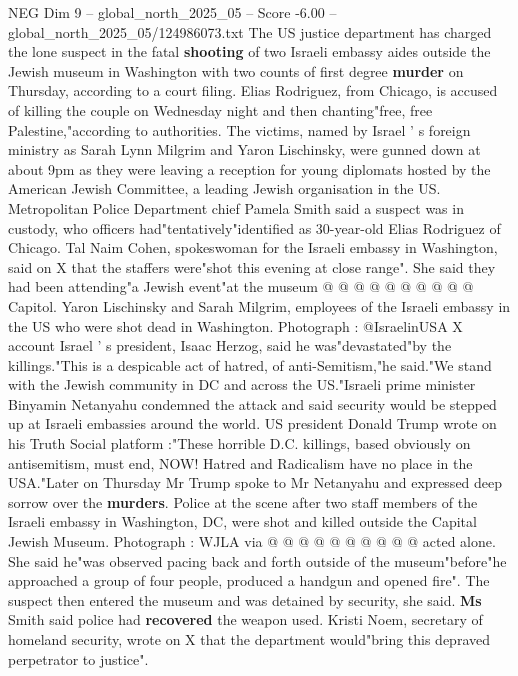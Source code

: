 \begin{textsample}{NEG Dim 9 – global\_north\_2025\_05 – Score -6.00 – global\_north\_2025\_05/124986073.txt}  \label{ex:f9_neg_174}
The US justice department has charged the lone suspect in the fatal \textbf{shooting} of two Israeli embassy aides outside the Jewish museum in Washington with two counts of first degree \textbf{murder} on Thursday, according to a court filing.
Elias Rodriguez, from Chicago, is accused of killing the couple on Wednesday night and then chanting"free, free Palestine,"according to authorities.
The victims, named by Israel ' s foreign ministry as Sarah Lynn Milgrim and Yaron Lischinsky, were gunned down at about 9pm as they were leaving a reception for young diplomats hosted by the American Jewish Committee, a leading Jewish organisation in the US.
Metropolitan Police Department chief Pamela Smith said a suspect was in custody, who officers had"tentatively"identified as 30-year-old Elias Rodriguez of Chicago.
Tal Naim Cohen, spokeswoman for the Israeli embassy in Washington, said on X that the staffers were"shot this evening at close range".
She said they had been attending"a Jewish event"at the museum @ @ @ @ @ @ @ @ @ @ Capitol.
Yaron Lischinsky and Sarah Milgrim, employees of the Israeli embassy in the US who were shot dead in Washington.
Photograph : @IsraelinUSA X account Israel ' s president, Isaac Herzog, said he was"devastated"by the killings."This is a despicable act of hatred, of anti-Semitism,"he said."We stand with the Jewish community in DC and across the US."Israeli prime minister Binyamin Netanyahu condemned the attack and said security would be stepped up at Israeli embassies around the world.
US president Donald Trump wrote on his Truth Social platform :"These horrible D.C. killings, based obviously on antisemitism, must end, NOW!
Hatred and Radicalism have no place in the USA."Later on Thursday Mr Trump spoke to Mr Netanyahu and expressed deep sorrow over the \textbf{murders}.
Police at the scene after two staff members of the Israeli embassy in Washington, DC, were shot and killed outside the Capital Jewish Museum.
Photograph : WJLA via @ @ @ @ @ @ @ @ @ @ acted alone.
She said he"was observed pacing back and forth outside of the museum"before"he approached a group of four people, produced a handgun and opened fire".
The suspect then entered the museum and was detained by security, she said. \textbf{Ms} Smith said police had \textbf{recovered} the weapon used.
Kristi Noem, secretary of homeland security, wrote on X that the department would"bring this depraved perpetrator to justice".

\end{textsample}
